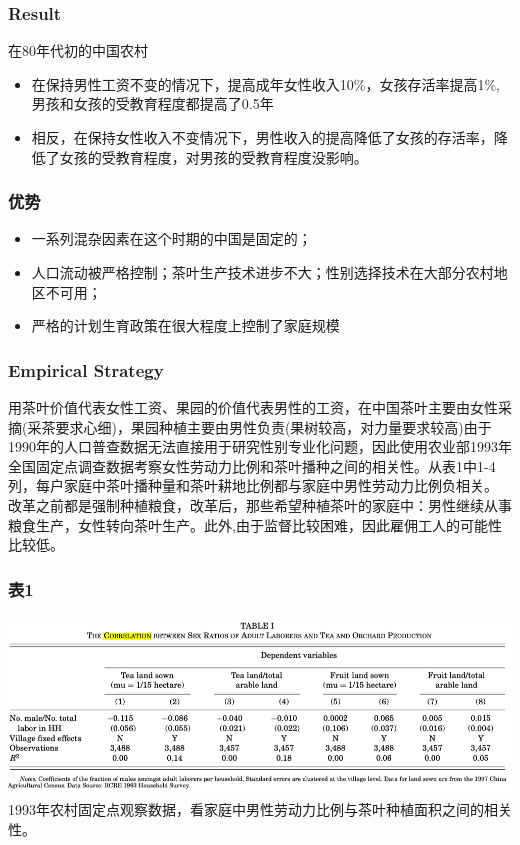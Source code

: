\documentclass{beamer}
\begin{document}
\begin{frame}
\frametitle{Result}
在80年代初的中国农村
\begin{itemize}
	\item 在保持男性工资不变的情况下，提高成年女性收入10\%，女孩存活率提高1\%,男孩和女孩的受教育程度都提高了0.5年
	\item 相反，在保持女性收入不变情况下，男性收入的提高降低了女孩的存活率，降低了女孩的受教育程度，对男孩的受教育程度没影响。
\end{itemize}
\end{frame}

\begin{frame}
\frametitle{优势}
	\begin{itemize}
		\item 一系列混杂因素在这个时期的中国是固定的；
		\item 人口流动被严格控制；茶叶生产技术进步不大；性别选择技术在大部分农村地区不可用；
		\item 严格的计划生育政策在很大程度上控制了家庭规模
	\end{itemize}
	
\end{frame}


\begin{frame}
	\frametitle{Empirical Strategy}
用茶叶价值代表女性工资、果园的价值代表男性的工资，在中国茶叶主要由女性采摘(采茶要求心细)，果园种植主要由男性负责(果树较高，对力量要求较高)由于1990年的人口普查数据无法直接用于研究性别专业化问题，因此使用农业部1993年全国固定点调查数据考察女性劳动力比例和茶叶播种之间的相关性。从表1中1-4列，每户家庭中茶叶播种量和茶叶耕地比例都与家庭中男性劳动力比例负相关。 
\\ 改革之前都是强制种植粮食，改革后，那些希望种植茶叶的家庭中：男性继续从事粮食生产，女性转向茶叶生产。此外,由于监督比较困难，因此雇佣工人的可能性比较低。

\end{frame}

\begin{frame}
\frametitle{表1}
\includegraphics[scale=0.35]{table1}
\\ 1993年农村固定点观察数据，看家庭中男性劳动力比例与茶叶种植面积之间的相关性。
\end{frame}
\end{document}
